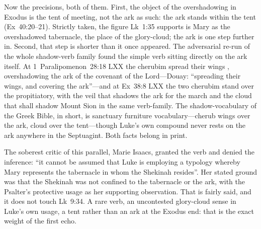Now the precisions, both of them. First, the object of the overshadowing
in Exodus is the tent of meeting, not the ark as such: the ark stands
within the tent (Ex~40:20--21). Strictly taken, the figure Lk~1:35
supports is Mary as the overshadowed tabernacle, the place of the
glory-cloud; the ark is one step further in. Second, that step is shorter
than it once appeared. The adversarial re-run of the whole shadow-verb
family found the simple verb  sitting directly on the ark
itself. At 1~Paralipomenon~28:18 LXX the cherubim spread their wings
, overshadowing the ark of the covenant
of the Lord---Douay: ``spreading their wings, and covering the ark''---and
at Ex~38:8 LXX the two cherubim stand  over the
propitiatory, with the veil that shadows the ark for the march and the
cloud that shall shadow Mount Sion in the same verb-family.
The shadow-vocabulary of the Greek Bible, in short, is sanctuary furniture
vocabulary---cherub wings over the ark, cloud over the tent---though Luke's
own compound  never rests on the ark anywhere in the
Septuagint. Both facts belong in print.

The soberest critic of this parallel, Marie Isaacs, granted the verb and
denied the inference: ``it cannot be assumed that Luke is employing a
typology whereby Mary represents the tabernacle in whom the Shekinah
resides''. Her stated ground was that the Shekinah was not confined to
the tabernacle or the ark, with the Psalter's protective usage as her
supporting observation. That is
fairly said, and it does not touch Lk~9:34. A rare verb, an uncontested
glory-cloud sense in Luke's own usage, a tent rather than an ark at the
Exodus end: that is the exact weight of the first echo.

